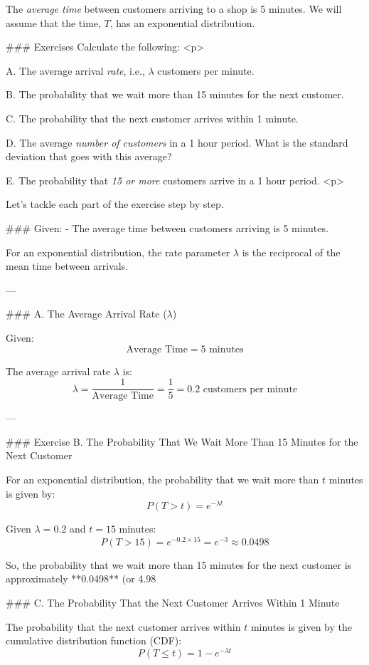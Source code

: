 
The \emph{average time} between customers arriving to a shop is 5 minutes. 
We will assume that the time, $T$, has an exponential distribution. 

### Exercises Calculate the following:
<p>

A.  The average arrival \emph{rate}, i.e., $\lambda$ customers per minute.  

B.  The probability that we wait more than 15 minutes for the next customer.  

C.  The probability that the next customer arrives within 1 minute.  

D.  The average \emph{number of customers} in a 1 hour period. What is the standard deviation that goes with this average?  

E.  The probability that \emph{15 or more} customers arrive in a 1 hour period.
<p>

Let's tackle each part of the exercise step by step.

### Given:
- The average time between customers arriving is 5 minutes.

For an exponential distribution, the rate parameter $\lambda$ is the reciprocal of the mean time between arrivals.

---

### A. The Average Arrival Rate ($\lambda$)

Given:
$$\text{Average Time} = 5 \text{ minutes}$$

The average arrival rate $\lambda$ is:
$$\lambda = \frac{1}{\text{Average Time}} = \frac{1}{5} = 0.2 \text{ customers per minute}$$


---

### Exercise B. 
The Probability That We Wait More Than 15 Minutes for the Next Customer

For an exponential distribution, the probability that we wait more than $ t $ minutes is given by:
$$P(T > t) = e^{-\lambda t}$$

Given $\lambda = 0.2$ and $ t = 15 $ minutes:
$$P(T > 15) = e^{-0.2 \times 15} = e^{-3} \approx 0.0498$$

So, the probability that we wait more than 15 minutes for the next customer is approximately **0.0498** (or 4.98%

### C. The Probability That the Next Customer Arrives Within 1 Minute

The probability that the next customer arrives within $ t $ minutes is given by the cumulative distribution function (CDF):
$$P(T \leq t) = 1 - e^{-\lambda t}$$

